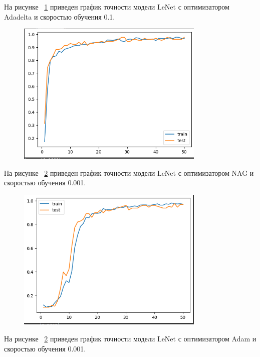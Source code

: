 \documentclass[a4paper, 14pt]{extarticle}
\begin{document}
На рисунке ~\ref{fig:img2} приведен график точности модели LeNet с оптимизатором Adadelta и скоростью обучения 0.1.

\begin{figure}[H]
\centering
\includegraphics[width=0.8\textwidth]{images/res2.png}
\caption{}
\label{fig:img2}
\end{figure}

На рисунке ~\ref{fig:img3} приведен график точности модели LeNet с оптимизатором NAG и скоростью обучения 0.001.

\begin{figure}[H]
\centering
\includegraphics[width=0.8\textwidth]{images/res3.png}
\caption{}
\label{fig:img3}
\end{figure}

На рисунке ~\ref{fig:img3} приведен график точности модели LeNet с оптимизатором Adam и скоростью обучения 0.001.
\end{document}
